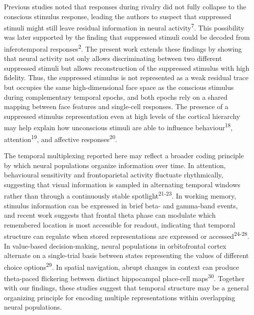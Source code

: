 \documentclass{article}
\begin{document}
Previous studies noted that responses during rivalry did not fully collapse to the conscious stimulus response, leading the authors to suspect that suppressed stimuli might still leave residual information in neural activity\textsuperscript{7}. This possibility was later supported by the finding that suppressed stimuli could be decoded from inferotemporal responses\textsuperscript{2}. The present work extends these findings by showing that neural activity not only allows discriminating between two different suppressed stimuli but allows reconstruction of the suppressed stimulus with high fidelity. Thus, the suppressed stimulus is not represented as a weak residual trace but occupies the same high-dimensional face space as the conscious stimulus during complementary temporal epochs, and both epochs rely on a shared mapping between face features and single-cell responses. The presence of a suppressed stimulus representation even at high levels of the cortical hierarchy may help explain how unconscious stimuli are able to influence behaviour\textsuperscript{18}, attention\textsuperscript{19}, and affective responses\textsuperscript{20}.

The temporal multiplexing reported here may reflect a broader coding principle by which neural populations organize information over time. In attention, behavioural sensitivity and frontoparietal activity fluctuate rhythmically, suggesting that visual information is sampled in alternating temporal windows rather than through a continuously stable spotlight\textsuperscript{21-23}. In working memory, stimulus information can be expressed in brief beta- and gamma-band events, and recent work suggests that frontal theta phase can modulate which remembered location is most accessible for readout, indicating that temporal structure can regulate when stored representations are expressed or accessed\textsuperscript{24-28}. In value-based decision-making, neural populations in orbitofrontal cortex alternate on a single-trial basis between states representing the values of different choice options\textsuperscript{29}. In spatial navigation, abrupt changes in context can produce theta-paced flickering between distinct hippocampal place-cell maps\textsuperscript{30}. Together with our findings, these studies suggest that temporal structure may be a general organizing principle for encoding multiple representations within overlapping neural populations.
\end{document}
